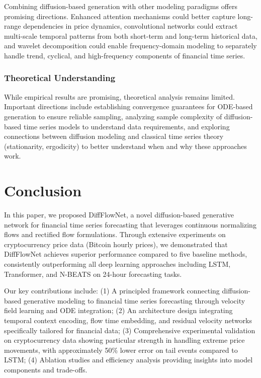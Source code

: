 \documentclass[11pt,a4paper]{article}
\begin{document}
Combining diffusion-based generation with other modeling paradigms offers promising directions. Enhanced attention mechanisms could better capture long-range dependencies in price dynamics, convolutional networks could extract multi-scale temporal patterns from both short-term and long-term historical data, and wavelet decomposition could enable frequency-domain modeling to separately handle trend, cyclical, and high-frequency components of financial time series.

\subsubsection{Theoretical Understanding}

While empirical results are promising, theoretical analysis remains limited. Important directions include establishing convergence guarantees for ODE-based generation to ensure reliable sampling, analyzing sample complexity of diffusion-based time series models to understand data requirements, and exploring connections between diffusion modeling and classical time series theory (stationarity, ergodicity) to better understand when and why these approaches work.

\section{Conclusion}

In this paper, we proposed DiffFlowNet, a novel diffusion-based generative network for financial time series forecasting that leverages continuous normalizing flows and rectified flow formulations. Through extensive experiments on cryptocurrency price data (Bitcoin hourly prices), we demonstrated that DiffFlowNet achieves superior performance compared to five baseline methods, consistently outperforming all deep learning approaches including LSTM, Transformer, and N-BEATS on 24-hour forecasting tasks.

Our key contributions include: (1) A principled framework connecting diffusion-based generative modeling to financial time series forecasting through velocity field learning and ODE integration; (2) An architecture design integrating temporal context encoding, flow time embedding, and residual velocity networks specifically tailored for financial data; (3) Comprehensive experimental validation on cryptocurrency data showing particular strength in handling extreme price movements, with approximately 50\% lower error on tail events compared to LSTM; (4) Ablation studies and efficiency analysis providing insights into model components and trade-offs.
\end{document}
